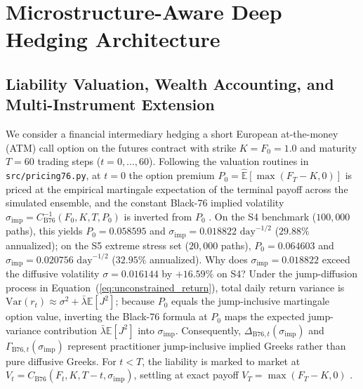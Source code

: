 \documentclass[11pt,a4paper]{article}
\begin{document}
\section{Microstructure-Aware Deep Hedging Architecture}
\label{sec:architecture}

\subsection{Liability Valuation, Wealth Accounting, and Multi-Instrument Extension}
We consider a financial intermediary hedging a short European at-the-money (ATM) call option on the futures contract with strike $K = F_0 = 1.0$ and maturity $T = 60$ trading steps ($t = 0, \dots, 60$). Following the valuation routines in \texttt{src/pricing76.py}, at $t = 0$ the option premium $P_0 = \widehat{\mathbb{E}}[\max(F_T - K, 0)]$ is priced at the empirical martingale expectation of the terminal payoff across the simulated ensemble, and the constant Black-76 implied volatility $\sigma_{\text{imp}} = C_{\text{B76}}^{-1}(F_0, K, T, P_0)$ is inverted from $P_0$ \citep{Black1976}. On the S4 benchmark ($100,000$ paths), this yields $P_0 = 0.058595$ and $\sigma_{\text{imp}} = 0.018822\text{ day}^{-1/2}$ ($29.88\%$ annualized); on the S5 extreme stress set ($20,000$ paths), $P_0 = 0.064603$ and $\sigma_{\text{imp}} = 0.020756\text{ day}^{-1/2}$ ($32.95\%$ annualized). Why does $\sigma_{\text{imp}} = 0.018822$ exceed the diffusive volatility $\sigma = 0.016144$ by $+16.59\%$ on S4? Under the jump-diffusion process in Equation~(\ref{eq:unconstrained_return}), total daily return variance is $\text{Var}(r_t) \approx \sigma^2 + \bar{\lambda}\mathbb{E}[J^2]$; because $P_0$ equals the jump-inclusive martingale option value, inverting the Black-76 formula at $P_0$ maps the expected jump-variance contribution $\bar{\lambda}\mathbb{E}[J^2]$ into $\sigma_{\text{imp}}$. Consequently, $\Delta_{\text{B76},t}(\sigma_{\text{imp}})$ and $\Gamma_{\text{B76},t}(\sigma_{\text{imp}})$ represent practitioner jump-inclusive implied Greeks rather than pure diffusive Greeks. For $t < T$, the liability is marked to market at $V_t = C_{\text{B76}}(F_t, K, T - t, \sigma_{\text{imp}})$, settling at exact payoff $V_T = \max(F_T - K, 0)$ \citep{Marzban2022,CarbonneauGodin2024}.
\end{document}
